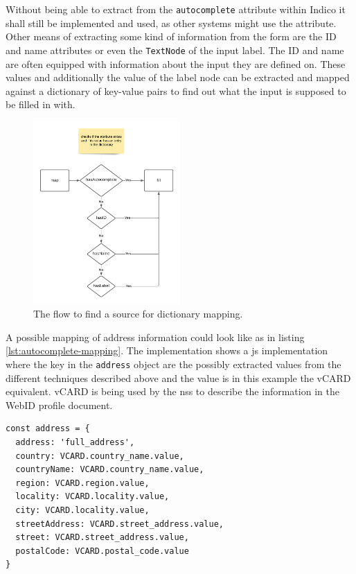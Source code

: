 Without being able to extract from the \texttt{autocomplete} attribute within Indico it shall still be implemented and used, as other systems might use the attribute. Other means of extracting some kind of information from the form are the ID and name attributes or even the \texttt{TextNode} of the input label. The ID and name are often equipped with information about the input they are defined on. These values and additionally the value of the label node can be extracted and mapped against a dictionary of key-value pairs to find out what the input is supposed to be filled in with.

\begin{figure}[ht!]
    \centering
    \includegraphics[width=0.5\textwidth]{prototype/graphs/poc-autocomplete-mapping-flow.png}
    \caption{The flow to find a source for dictionary mapping.}
    \label{fig:poc-autocomplete-mapping-flow}
\end{figure}

A possible mapping of address information could look like as in listing \ref{lst:autocomplete-mapping}. The implementation shows a \gls{js} implementation where the key in the \texttt{address} object are the possibly extracted values from the different techniques described above and the value is in this example the vCARD \cite{vcard-spec} equivalent. vCARD is being used by the \gls{nss} to describe the information in the WebID profile document.

\begin{lstlisting}[language=Other,columns=fullflexible, caption={Dictionary to map extracted values with predicates from Turtle resource}, label={lst:autocomplete-mapping}]
const address = {
  address: 'full_address',
  country: VCARD.country_name.value,
  countryName: VCARD.country_name.value,
  region: VCARD.region.value,
  locality: VCARD.locality.value,
  city: VCARD.locality.value,
  streetAddress: VCARD.street_address.value,
  street: VCARD.street_address.value,
  postalCode: VCARD.postal_code.value
}
\end{lstlisting}

